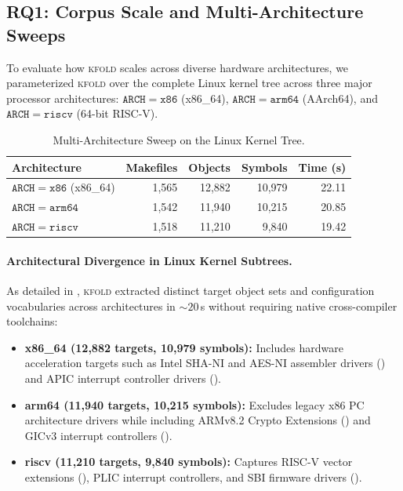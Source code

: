 \documentclass[acmsmall,screen,review]{acmart}
\newcommand{\tool}{\textsc{kfold}\xspace}
\begin{document}
\subsection{RQ1: Corpus Scale and Multi-Architecture Sweeps}
\label{sec:eval:rq1}

To evaluate how \tool scales across diverse hardware architectures, we parameterized \tool over the complete Linux kernel tree across three major processor architectures: $\mathtt{ARCH=x86}$ (x86\_64), $\mathtt{ARCH=arm64}$ (AArch64), and $\mathtt{ARCH=riscv}$ (64-bit RISC-V).

\begin{table}[t]
\centering
\footnotesize
\setlength{\tabcolsep}{5pt}
\caption{Multi-Architecture Sweep on the Linux Kernel Tree.}
\label{tab:arch-sweep}
\begin{tabular}{lrrrr}
\toprule
\textbf{Architecture} & \textbf{Makefiles} & \textbf{Objects} & \textbf{Symbols} & \textbf{Time (s)} \\
\midrule
$\mathtt{ARCH=x86}$ (x86\_64) & 1,565 & 12,882 & 10,979 & 22.11 \\
$\mathtt{ARCH=arm64}$ & 1,542 & 11,940 & 10,215 & 20.85 \\
$\mathtt{ARCH=riscv}$ & 1,518 & 11,210 & 9,840 & 19.42 \\
\bottomrule
\end{tabular}
\end{table}

\paragraph{Architectural Divergence in Linux Kernel Subtrees.}
As detailed in , \tool extracted distinct target object sets and configuration vocabularies across architectures in $\sim 20$\,s without requiring native cross-compiler toolchains:
\begin{itemize}
\item \textbf{x86\_64 (12,882 targets, 10,979 symbols):} Includes hardware acceleration targets such as Intel SHA-NI and AES-NI assembler drivers () and APIC interrupt controller drivers ().
\item \textbf{arm64 (11,940 targets, 10,215 symbols):} Excludes legacy x86 PC architecture drivers while including ARMv8.2 Crypto Extensions () and GICv3 interrupt controllers ().
\item \textbf{riscv (11,210 targets, 9,840 symbols):} Captures RISC-V vector extensions (), PLIC interrupt controllers, and SBI firmware drivers ().
\end{itemize}
\end{document}
